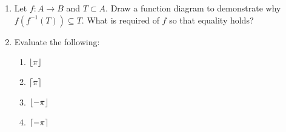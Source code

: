 \documentclass[letterpaper,12pt,fleqn]{article}
\begin{document}
\begin{enumerate}[left=0in,itemsep=0.5in]
\item Let \(f:A\to B\) and \(T\subset A\).  Draw a function diagram to demonstrate why \(f(f^{-1}(T))\subseteq T\).
  What is required of \(f\) so that equality holds?

\item Evaluate the following:
  \begin{enumerate}
  \item \(\lfloor\pi\rfloor\)
  \item \(\lceil\pi\rceil\)
  \item \(\lfloor-\pi\rfloor\)
  \item \(\lceil-\pi\rceil\)
  \end{enumerate}
\end{enumerate}
\end{document}
